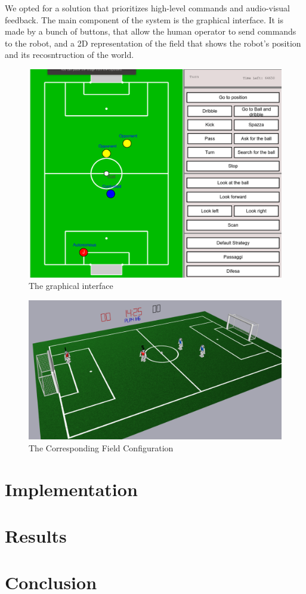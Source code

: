 \documentclass[a4paper, onecolumn, 12pt]{article}
\begin{document}
We opted for a solution that prioritizes high-level commands and audio-visual
feedback. The main component of the system is the graphical interface. It is
made by a bunch of buttons, that allow the human operator to send commands to the
robot, and a 2D representation of the field that shows the robot's position and
its recosntruction of the world.  

\begin{figure}[H]
    \centering
    \includegraphics[width=0.9\linewidth]{assets/interface.png}
    \caption{The graphical interface}
    \label{fig:interface}
\end{figure}

\begin{figure}[H]
    \centering
    \includegraphics[width=0.9\linewidth]{assets/simrobot.png}
    \caption{The Corresponding Field Configuration}
    \label{fig:nao}
\end{figure}

\section{Implementation}
\label{sec:impl}


\section{Results}
\label{sec:res}


\section{Conclusion}
\label{sec:con}




\end{document}

